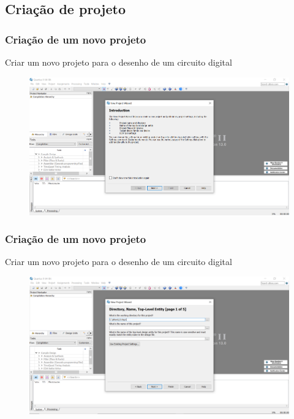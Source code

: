 \documentclass{CPSPresentation}
\begin{document}
\subsection{Criação de projeto}
\begin{frame}
	\frametitle{Criação de um novo projeto}
	
	\begin{block}{}
		\justifying
		Criar um novo projeto para o desenho de um circuito digital
	\end{block}
	
	\begin{figure}[h]
		\centering
		\includegraphics[width=1.02\textwidth]{quartus/fig07.png}
	\end{figure}
	
	
\end{frame}
\begin{frame}
	\frametitle{Criação de um novo projeto}
	
	\begin{block}{}
		\justifying
		Criar um novo projeto para o desenho de um circuito digital
	\end{block}
	
	\begin{figure}[h]
		\centering
		\includegraphics[width=1.02\textwidth]{quartus/fig08.png}
	\end{figure}
	
	
\end{frame}
\end{document}
